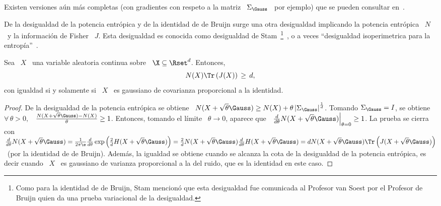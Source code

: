 Existen versiones a\'un m\'as completas  (con gradientes con respeto a la matriz
\  $\Sigma_\Gauss$  \  por  ejemplo)  que se  pueden  consultar  en~\cite{Joh04,
  PalVer06, PayPal09}.




\label{Sssec:SZ:Stam}


De la  desigualdad de  la potencia entr\'opica  y de  la identidad de  de Bruijn
surge  una otra  desigualdad implicando  la potencia  entr\'opica \  $N$ \  y la
informaci\'on de Fisher \ $J$.  Esta desigualdad es conocida como desigualdad de
Stam~\footnote{Como para  la identidad  de de Bruijn,  Stam mencion\'o  que esta
  desigualdad fue  comunicada al  Profesor van Soest  por el Profesor  de Bruijn
  quien  da una  prueba variacional  de la  desigualdad.}~\cite{CovTho06, Rio07,
  Sta59},     o    a    veces     ``desigualdad    isoperimetrica     para    la
entrop\'ia''~\cite{WanMad04}.
%
\begin{teorema}
  Sea  \  $X$   \  una  variable  aleatoria  continua   sobre  \  $\X  \subseteq
  \Rset^d$. Entonces,
  \[
  N(X) \Tr\left( J(X) \right) \, \ge \, d,
  \]
  con igualdad si y solamente si \ $X$ \ es gaussiano de covarianza proporcional
  a la identidad.
\end{teorema}
%
\begin{proof}
  De la desigualdad de la potencia entr\'opica se obtiene \ $N(X + \sqrt{\theta}
  \Gauss)  \ge N(X)  + \theta  \left| \Sigma_\Gauss  \right|^{\frac1d}$. Tomando
  $\Sigma_\Gauss =  I$, se  obtiene \ $\forall  \, \theta  > 0,$ \  $\frac{N(X +
    \sqrt{\theta} \Gauss) - N(X)}{\theta}  \ge 1$.  Entonces, tomando el l\'imite
  \ $\theta \to 0$, aparece  que \ $\left. \frac{d}{d\theta} N(X + \sqrt{\theta}
    \Gauss)   \right|_{\theta  =   0}  \ge   1$.   La   prueba  se   cierra  con
  $\frac{d}{d\theta}  N(X   +  \sqrt{\theta}   \Gauss)  =  \frac{1}{2   \pi  \e}
  \frac{d}{d\theta}  \exp\left( \frac2d  H(X +  \sqrt{\theta} \Gauss)  \right) =
  \frac2d  N(X +  \sqrt{\theta}  \Gauss) \frac{d}{d\theta}  H(X +  \sqrt{\theta}
  \Gauss) = d N(X +  \sqrt{\theta} \Gauss) \Tr\left( J(X + \sqrt{\theta} \Gauss)
  \right)$ \ (por la identidad de  de Bruijn).  Adem\'as, la igualdad se obtiene
  cuando se  alcanza la cota  de la desigualdad  de la potencia  entr\'opica, es
  decir cuando \ $X$ \ es gaussiano de varianza proporcional a la del ruido, que
  es la identidad en este caso.
\end{proof}
